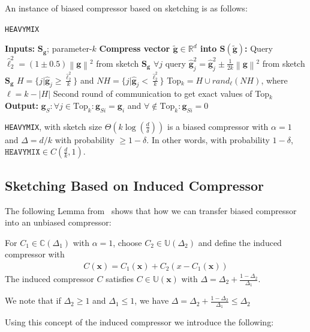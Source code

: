 An instance of biased compressor based on sketching is as follows:
\begin{algorithm}[H]
\caption{\texttt{HEAVYMIX}~\cite{ivkin2019communication} }\label{Alg:sketch}
\begin{algorithmic}[1]
\State \textbf{Inputs:} $\mathbf{S}_{\mathbf{g}}$; parameter-$k$
\State \textbf{Compress vector $\tilde{\mathbf{g}}\in\mathbb{R}^{d}$ into $\mathbf{S}\left(\tilde{\mathbf{g}}\right)$:}
\State Query $\hat{\ell}_2^2=\left(1\pm 0.5\right)\left\|\mathbf{g}\right\|^2$ from sketch $\mathbf{S}_{\mathbf{g}}$
\State $\forall j$ query $\hat{\mathbf{g}}_j^2=\hat{\mathbf{g}}_j^2\pm \frac{1}{2k}\left\|\mathbf{g}\right\|^2$ from sketch $\mathbf{S}_{\mathbf{g}}$
\State $H=\{j|\hat{\mathbf{g}}_j\geq \frac{\hat{\ell}_2^2}{k}\}$ and $NH=\{j|\hat{\mathbf{g}}_j<\frac{\hat{\ell}_2^2}{k}\}$
\State Top$_k=H\cup rand_\ell(NH)$, where $\ell=k-\left|H\right|$
\State Second round of communication to get exact values of Top$_k$ 
\State \textbf{Output:} $\mathbf{g}_S:\forall j\in\text{Top}_k:\mathbf{g}_{Si}=\mathbf{g}_{i}$ and $\forall\notin\text{Top}_k: \mathbf{g}_{Si}=0$
\end{algorithmic}
\end{algorithm}

\begin{lemma}
\texttt{HEAVYMIX}, with sketch size $\Theta\left(k\log\left(\frac{d}{\delta}\right)\right)$ is a biased compressor with $\alpha=1$ and  $\Delta=d/k$ with probability $\geq1-\delta$. In other words, with probability $1-\delta$, $\texttt{HEAVYMIX}\in C(\frac{d}{k},1)$. 
\end{lemma}
\subsection{Sketching Based on Induced Compressor}
The following Lemma from~\cite{horvath2020better} shows that how we can transfer biased compressor into an unbiased compressor: 
\begin{lemma}\label{lemm:induced_compress}
For $C_1\in \mathbb{C}(\Delta_1)$ with $\alpha=1$, choose $C_2\in \mathbb{U}(\Delta_2)$ and define the induced compressor with
\begin{align}
    C(\mathbf{x})=C_1(\mathbf{x})+C_2\left(x-C_1\left(\mathbf{x}\right)\right)
\end{align}
The induced compressor $C$ satisfies $C\in\mathbb{U}(\mathbf{x})$ with $\Delta=\Delta_2+\frac{1-\Delta_2}{\Delta_1}$.
\end{lemma}
\begin{remark}
We note that if $\Delta_2\geq 1$ and $\Delta_1\leq 1$, we have $\Delta=\Delta_2+\frac{1-\Delta_2}{\Delta_1}\leq \Delta_2$
\end{remark}
Using this concept of the induced compressor we introduce the following:



